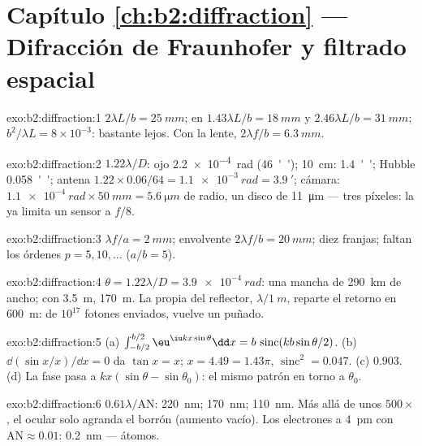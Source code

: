 \section*{Capítulo \ref{ch:b2:diffraction} --- Difracción de Fraunhofer y filtrado espacial}

\begin{solution}{exo:b2:diffraction:1}
$2\lambda L/b = \qty{25}{mm}$;  en $1.43\lambda L/b = \qty{18}{mm}$ y
$2.46\lambda L/b = \qty{31}{mm}$;  $b^2/\lambda L = 8 \times 10^{-3}$: bastante
lejos. Con la lente, $2\lambda f/b = \qty{6.3}{mm}$.
\end{solution}

\begin{solution}{exo:b2:diffraction:2}
$1.22\lambda/D$: ojo \qty{2.2e-4}{rad} (\qty{46}{''}); \qty{10}{cm}: \qty{1.4}{''}; Hubble
\qty{0.058}{''}; antena $1.22 \times 0.06/64 = \qty{1.1e-3}{rad} = \qty{3.9}{'}$; cámara:
$\qty{1.1e-4}{rad} \times \qty{50}{mm} = \qty{5.6}{\micro m}$ de radio, un disco de \qty{11}{\micro m} ---
tres píxeles: la  ya limita un sensor a $f/8$.
\end{solution}

\begin{solution}{exo:b2:diffraction:3}
$\lambda f/a = \qty{2}{mm}$; envolvente $2\lambda f/b = \qty{20}{mm}$; diez franjas; faltan los órdenes
$p = 5, 10, \dots$ ($a/b = 5$).
\end{solution}

\begin{solution}{exo:b2:diffraction:4}
$\theta = 1.22\lambda/D = \qty{3.9e-4}{rad}$: una mancha de \qty{290}{km} de ancho; con \qty{3.5}{m},
\qty{170}{m}. La propia  del reflector, $\lambda/\qty{1}{m}$, reparte el
retorno en \qty{600}{m}: de $10^{17}$ fotones enviados, vuelve un puñado.
\end{solution}

\begin{solution}{exo:b2:diffraction:5}
(a) $\int_{-b/2}^{b/2}\eu^{\iu kx\sin\theta}\dd x = b\,\operatorname{sinc}(kb\sin\theta/2)$. (b)
$\dd(\sin x/x)/\dd x = 0$ da $\tan x = x$; $x = 4.49 = 1.43\pi$, $\operatorname{sinc}^2 =
0.047$. (c) $0.903$. (d) La fase pasa a $kx(\sin\theta - \sin\theta_0)$: el
mismo patrón en torno a $\theta_0$.
\end{solution}

\begin{solution}{exo:b2:diffraction:6}
$0.61\lambda/\mathrm{AN}$: \qty{220}{nm}; \qty{170}{nm}; \qty{110}{nm}. Más allá de unos $500\times$,
el ocular solo agranda el borrón (aumento vacío). Los electrones
a \qty{4}{pm} con $\mathrm{AN} \approx 0.01$: \qty{0.2}{nm} --- átomos.
\end{solution}

